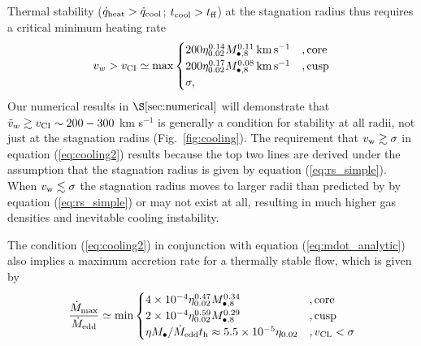 \documentclass[usenatbib,fleqn]{mn2e}
\begin{document}
Thermal stability ($\dot{q}_{\rm heat} > \dot{q}_{\rm cool}$; $t_{\rm cool} > t_{\rm ff}$) at the stagnation radius thus requires a critical minimum heating rate
\begin{align}
v_{w} > v_{\rm CI} \simeq
  {\rm max}\begin{cases}
   200 \eta_{0.02}^{0.14} M_{\bullet,8}^{0.11}\,{\rm km\,s^{-1}}  &, \text{core}\\
   200 \eta_{0.02}^{0.17} M_{\bullet,8}^{0.08}\,{\rm km\,s^{-1}}   &, \text{cusp}\\
\sigma,     
  \end{cases}
  \label{eq:cooling2}
\end{align}
Our numerical results in $\S\ref{sec:numerical}$ will demonstrate that $\tilde{v}_{w} \gtrsim v_{\rm CI} \sim 200-300$ km s$^{-1}$ is generally a condition for stability at all radii, not just at the stagnation radius (Fig.~\ref{fig:cooling}).  The requirement that $v_{\rm w} \gtrsim \sigma$ in equation (\ref{eq:cooling2}) results because the top two lines are derived under the assumption that the stagnation radius is given by equation (\ref{eq:rs_simple}).  When $v_{\rm w} \lesssim \sigma$ the stagnation radius moves to larger radii than predicted by by equation (\ref{eq:rs_simple}) or may not exist at all, resulting in much higher gas densities and inevitable cooling instability.  

The condition (\ref{eq:cooling2}) in conjunction with equation (\ref{eq:mdot_analytic}) also implies a maximum accretion rate for a thermally stable flow, which is given by
\begin{align}
\frac{\dot{M}_{\rm max}}{\dot{M}_{\rm edd}} \simeq
  {\rm min}\begin{cases}
   4\times 10^{-4} \eta_{0.02}^{0.47} M_{\bullet,8}^{0.34} &, \text{core}\\
   2\times 10^{-4} \eta_{0.02}^{0.59} M_{\bullet,8}^{0.29}    &, \text{cusp}\\
\eta M_{\bullet}/\dot{M}_{\rm edd}t_{\rm h} \approx 5.5\times 10^{-5}\eta_{0.02}&, v_{\rm CL} < \sigma
  \end{cases}
  \label{eq:Mdotmax}
\end{align}



\end{document}
